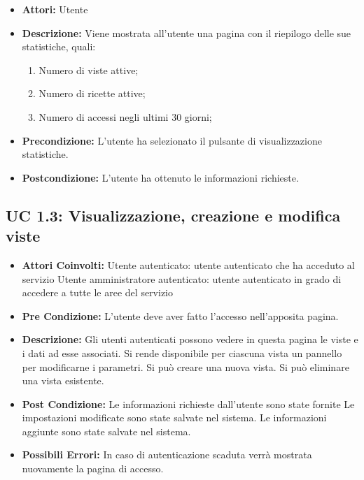 \begin{itemize}
\item \textbf{Attori:} Utente
\item \textbf{Descrizione:} Viene mostrata all'utente una pagina con il riepilogo delle sue statistiche, quali:
\begin{enumerate}
\item Numero di viste attive;
\item Numero di ricette attive;
\item Numero di accessi negli ultimi 30 giorni;
\end{enumerate}
\item \textbf{Precondizione:} L'utente ha selezionato il pulsante di visualizzazione statistiche.
\item \textbf{Postcondizione:} L'utente ha ottenuto le informazioni richieste.
\end{itemize}



\subsection{UC 1.3: Visualizzazione, creazione e modifica viste}

\begin{itemize}
\item \textbf{Attori Coinvolti:}
Utente autenticato: utente autenticato che ha acceduto al servizio
Utente amministratore autenticato: utente autenticato in grado di accedere a tutte le aree del servizio

\item \textbf{Pre Condizione:}
L’utente deve aver fatto l’accesso nell’apposita pagina.

\item \textbf{Descrizione:}
Gli utenti autenticati possono vedere in questa pagina le viste e i dati ad esse associati. 
Si rende disponibile per ciascuna vista un pannello per modificarne i parametri. 
Si può creare una nuova vista. 
Si può eliminare una vista esistente.

\item \textbf{Post Condizione:}
Le informazioni richieste dall’utente sono state fornite
Le impostazioni modificate sono state salvate nel sistema.
Le informazioni aggiunte sono state salvate nel sistema.

\item \textbf{Possibili Errori:}    
In caso di autenticazione scaduta verrà mostrata nuovamente la pagina di accesso.
\end{itemize}

